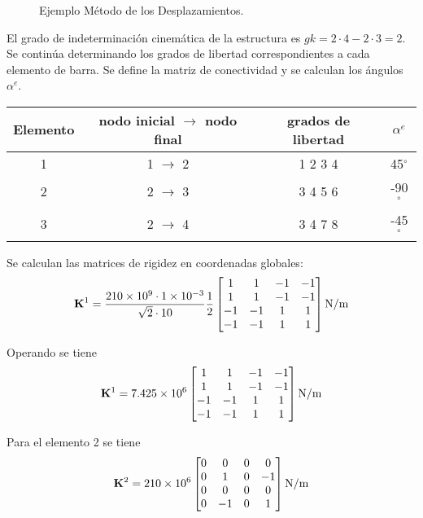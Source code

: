 \begin{figure}[htb]
\centering
\begin{center}
	\def\svgwidth{0.6\textwidth}
	
\end{center}
\caption{Ejemplo Método de los Desplazamientos.}
\label{fig:ejejmMDUT2}
\end{figure}


El grado de indeterminación cinemática de la estructura es $gk = 2 \cdot 4 - 2 \cdot 3 = 2$. %
%
Se continúa determinando los grados de libertad correspondientes a cada elemento de barra. Se define la matriz de conectividad y se calculan los ángulos $\alpha^e$.
%
\begin{center}
	\begin{tabular}{cccc}
		\hline
		Elemento & nodo inicial $\rightarrow$ nodo final & grados de libertad & $\alpha^e$\\
		\hline
		1 & 1 $\rightarrow$ 2 & 1 2 3 4 & 45$^\circ$\\
		2 & 2 $\rightarrow$ 3 & 3 4 5 6 & -90$^\circ$\\
		3 & 2 $\rightarrow$ 4 & 3 4 7 8 & -45$^\circ$\\
		\hline
	\end{tabular}
\end{center}

Se calculan las matrices de rigidez en coordenadas globales:
\begin{equation}
{\bf K}^1 = \frac{ 210 \times10^9 \cdot 1 \times 10^{-3} }{ \sqrt{2}  \cdot 10} \frac{1}{2}
\left[
\begin{matrix}
1 & 1 & -1 & -1 \\
1 & 1 & -1 & -1\\
-1 & -1 &  1 & 1\\
-1 & -1 & 1 & 1
\end{matrix}
\right]
\text{N/m}
\end{equation}

Operando se tiene
\begin{equation}
{\bf K}^1 = 7.425 \times 10^6
\left[
\begin{matrix}
1 & 1 & -1 & -1 \\
1 & 1 & -1 & -1\\
-1 & -1 &  1 & 1\\
-1 & -1 & 1 & 1
\end{matrix}
\right]
\text{N/m}
\end{equation}

Para el elemento 2 se tiene
\begin{equation}
{\bf K}^2 = 210 \times 10^6
\left[
\begin{matrix}
0 & 0 & 0 & 0 \\
0 & 1 & 0 & -1\\
0 & 0 &  0 & 0\\
0 & -1 & 0 & 1
\end{matrix}
\right]
\text{N/m}
\end{equation}

